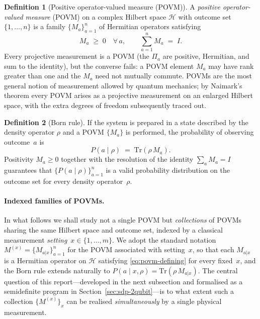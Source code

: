 \documentclass[oneside, a4paper, onecolumn, 11pt]{article}
\theoremstyle{definition}
\newtheorem{definition}{Definition}[section]
\theoremstyle{plain}
\theoremstyle{remark}
\begin{document}
\begin{definition}[Positive operator-valued measure (POVM)]
\label{def:povm}
A \emph{positive operator-valued measure} (POVM) on a complex Hilbert
space $\mathcal{H}$ with outcome set $\{1, \dots, n\}$ is a family
$\{M_a\}_{a = 1}^{n}$ of Hermitian operators satisfying
\begin{equation}
  M_a \;\geq\; 0 \quad \forall\, a, \qquad
  \sum_{a = 1}^{n} M_a \;=\; I.
  \label{eq:povm-defining}
\end{equation}
Every projective measurement is a POVM (the $\Pi_a$ are positive,
Hermitian, and sum to the identity), but the converse fails: a POVM
element $M_a$ may have rank greater than one and the $M_a$ need not
mutually commute. POVMs are the most general notion of measurement
allowed by quantum mechanics; by Naimark's theorem every POVM arises
as a projective measurement on an enlarged Hilbert space, with the
extra degrees of freedom subsequently traced out.
\end{definition}

\begin{definition}[Born rule]
\label{def:born}
If the system is prepared in a state described by the density operator
$\rho$ and a POVM $\{M_a\}$ is performed, the probability of
observing outcome~$a$ is
\begin{equation}
  P(a \mid \rho) \;=\; \text{Tr}(\rho\, M_a).
  \label{eq:born}
\end{equation}
Positivity $M_a \geq 0$ together with the resolution of the
identity $\sum_a M_a = I$ guarantees that
$\{P(a \mid \rho)\}_{a = 1}^{n}$ is a valid probability distribution
on the outcome set for every density operator~$\rho$.
\end{definition}

\paragraph{Indexed families of POVMs.}
In what follows we shall study not a single POVM but \emph{collections}
of POVMs sharing the same Hilbert space and outcome set, indexed by a
classical measurement \emph{setting}~$x \in \{1, \dots, m\}$. We
adopt the standard notation $M^{(x)} = \{M_{a|x}\}_{a = 1}^{n}$ for
the POVM associated with setting~$x$, so that each $M_{a|x}$ is a
Hermitian operator on $\mathcal{H}$ satisfying
\eqref{eq:povm-defining} for every fixed~$x$, and the Born rule
extends naturally to $P(a \mid x, \rho) = \text{Tr}(\rho\, M_{a|x})$.
The central question of this report---developed in the next
subsection and formalised as a semidefinite program in
Section~\ref{sec:sdp-2qubit}---is to what extent such a collection
$\{M^{(x)}\}_{x}$ can be realised \emph{simultaneously} by a single
physical measurement.
\end{document}
